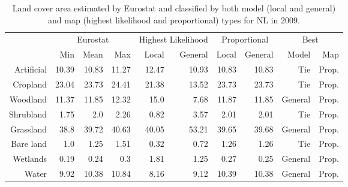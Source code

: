 \begin{table}[H]
\centering
\caption{Land cover area estimated by Eurostat and classified by both model (local and general) and map (highest likelihood and proportional) types for NL in 2009.}

\begin{tabular}{r|rrr|rr|rr|rr}
\toprule
{} & \multicolumn{3}{|c}{Eurostat} & \multicolumn{2}{|c}{Highest Likelihood} & \multicolumn{2}{|c}{Proportional} & \multicolumn{2}{|c}{Best} \\
{} &      Min &   Mean &    Max &              Local & General &        Local & General &    Model &    Map \\
\midrule
Artificial &    10.39 &  10.83 &  11.27 &              12.47 &   10.93 &        10.83 &   10.83 &      Tie &  Prop. \\
Cropland   &    23.04 &  23.73 &  24.41 &              21.38 &   13.52 &        23.73 &   23.73 &      Tie &  Prop. \\
Woodland   &    11.37 &  11.85 &  12.32 &               15.0 &    7.68 &        11.87 &   11.85 &  General &  Prop. \\
Shrubland  &     1.75 &    2.0 &   2.26 &               0.82 &    3.57 &         2.01 &    2.01 &      Tie &  Prop. \\
Grassland  &     38.8 &  39.72 &  40.63 &              40.05 &   53.21 &        39.65 &   39.68 &  General &  Prop. \\
Bare land  &      1.0 &   1.25 &   1.51 &               0.32 &    0.72 &         1.26 &    1.26 &      Tie &  Prop. \\
Wetlands   &     0.19 &   0.24 &    0.3 &               1.81 &    1.25 &         0.27 &    0.25 &  General &  Prop. \\
Water      &     9.92 &  10.38 &  10.84 &               8.16 &    9.12 &        10.39 &   10.38 &  General &  Prop. \\
\bottomrule
\end{tabular}
\end{table}

